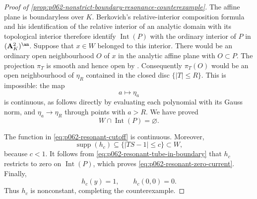 \begin{proof}[Proof of
\cref{prop:p062-nonstrict-boundary-resonance-counterexample}]
The affine plane is boundaryless over \(K\).  Berkovich's relative-interior
composition formula and his identification of the relative interior of an
analytic domain with its topological interior
\cite[Proposition~1.5.5(i)--(ii)]{Berk93} therefore identify
\(\operatorname{Int}(P)\) with the ordinary interior of \(P\) in
\((\mathbf A^2_K)^{\an}\).  Suppose that \(x\in W\) belonged to this
interior.  There would be an ordinary open neighbourhood \(O\) of \(x\)
in the analytic affine plane with \(O\subset P\).  The projection
\(\pi_T\) is smooth and hence open by
\cite[Corollary~3.7.4]{Berk93}.  Consequently \(\pi_T(O)\) would be an
open neighbourhood of \(\eta_R\) contained in the closed disc
\(\{|T|\leq R\}\).  This is impossible: the map
\[
                    a\longmapsto\eta_a
\]
is continuous, as follows directly by evaluating each polynomial with its
Gauss norm, and \(\eta_a\to\eta_R\) through points with \(a>R\).  We have
proved
\begin{equation}\label{eq:p062-resonant-tube-in-boundary}
                    W\cap\operatorname{Int}(P)=\varnothing.
\end{equation}

The function in \eqref{eq:p062-resonant-cutoff} is continuous.  Moreover,
\[
 \operatorname{supp}(h_c)
       \subseteq\{|TS-1|\leq c\}
       \subset W,
\]
because \(c<1\).  It follows from
\eqref{eq:p062-resonant-tube-in-boundary} that \(h_c\) restricts to zero
on \(\operatorname{Int}(P)\), which proves
\eqref{eq:p062-resonant-zero-current}.  Finally,
\[
                         h_c(y)=1,
                         \qquad h_c(0,0)=0.
\]
Thus \(h_c\) is nonconstant, completing the counterexample.
\end{proof}

